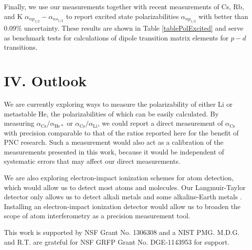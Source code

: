 \documentclass[twocolumn,prl,showpacs,superscriptaddress,longbibliography]{revtex4-1}   %
\newcommand{\acs}{\alpha_{\textrm{Cs}}}
\begin{document}
Finally, we use our measurements together with recent measurements of Cs, Rb, and K $\alpha_{np_{1/2}} - \alpha_{ns_{1/2}}$ \cite{Hunter1991,Miller1994} to report excited state polarizabilities $\alpha_{np_{1/2}}$ with better than 0.09\% uncertainty. 
These results are shown in Table \ref{tablePolExcited} and serve as benchmark tests for calculations of dipole transition matrix elements for $p-d$ transitions.

\section{IV. Outlook}

We are currently exploring ways to measure the polarizability of either Li or metastable He, the polarizabilities of which can be easily calculated. By measuring $\acs/\alpha_{\mathrm{He*}}$ or $\acs/\alpha_{\mathrm{Li}}$, we could report a direct measurement of $\acs$ with precision comparable to that of the ratios reported here for the benefit of PNC research. Such a measurement would also act as a calibration of the measurements presented in this work, because it would be independent of systematic errors that may affect our direct measurements.

We are also exploring electron-impact ionization schemes for atom detection, which would allow us to detect most atoms and molecules. Our Langmuir-Taylor detector only allows us to detect alkali metals and some alkaline-Earth metals \cite{Delhuille2002}. Installing an electron-impact ionization detector would allow us to broaden the scope of atom interferometry as a precision measurement tool. 

This work is supported by NSF Grant No. 1306308 and a NIST PMG. M.D.G. and R.T. are grateful for NSF GRFP Grant No. DGE-1143953 for support. 


%
%

\end{document}
